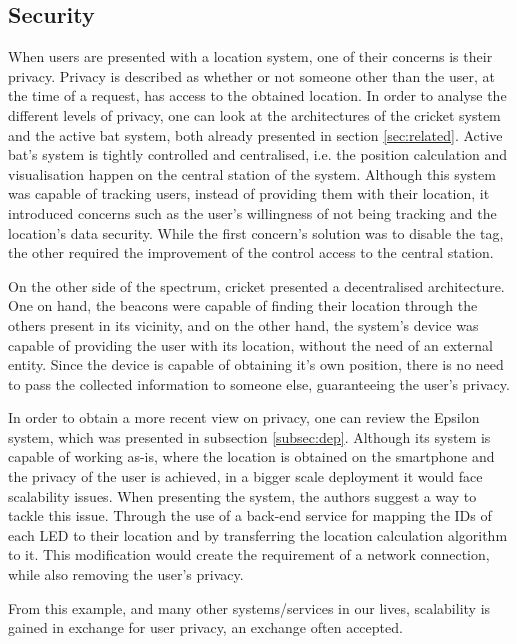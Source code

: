  
 
 
\subsection{Security} 
\label{subsec:sec} 
 
 
When users are presented with a location system, one of their concerns is their privacy. Privacy is described as whether or not someone other than the user, at the time of a request, has access to the obtained location. In order to analyse the different levels of privacy, one can look at the architectures of the cricket system and the active bat system, both already presented in section \ref{sec:related}. Active bat's system is tightly controlled and centralised, i.e. the position calculation and visualisation happen on the central station of the system. Although this system was capable of tracking users, instead of providing them with their location, it introduced concerns such as the user's willingness of not being tracking and the location's data security. While the first concern's solution was to disable the tag, the other required the improvement of the control access to the central station. 
 
 
On the other side of the spectrum, cricket presented a decentralised architecture. One on hand, the beacons were capable of finding their location through the others present in its vicinity, and on the other hand, the system's device was capable of providing the user with its location, without the need of an external entity. Since the device is capable of obtaining it's own position, there is no need to pass the collected information to someone else, guaranteeing the user's privacy.  
 
 
In order to obtain a more recent view on privacy, one can review the Epsilon system, which was presented in subsection \ref{subsec:dep}. Although its system is capable of working as-is, where the location is obtained on the smartphone and the privacy of the user is achieved, in a bigger scale deployment it would face scalability issues. When presenting the system, the authors suggest a way to tackle this issue. Through the use of a back-end service for mapping the IDs of each LED to their location and by transferring the location calculation algorithm to it. This modification would create the requirement of a network connection, while also removing the user's privacy.  
 
 
From this example, and many other systems/services in our lives, scalability is gained in exchange for user privacy, an exchange often accepted. 